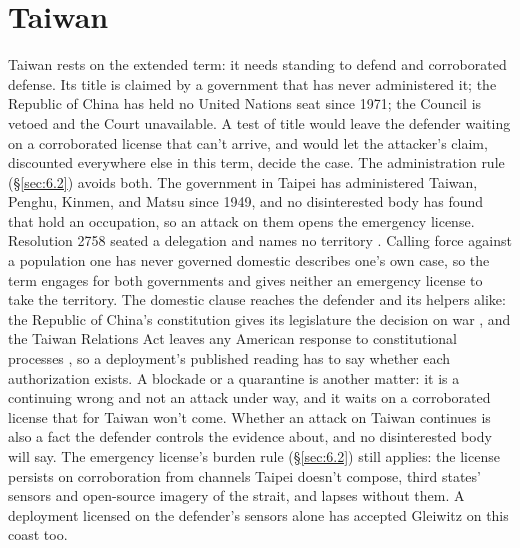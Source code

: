 \section{Taiwan}
\label{sec:B.3}
Taiwan rests on the extended term: it needs standing to defend and corroborated defense. Its title is claimed by a government that has never administered it; the Republic of China has held no United Nations seat since 1971; the Council is vetoed and the Court unavailable. A test of title would leave the defender waiting on a corroborated license that can't arrive, and would let the attacker's claim, discounted everywhere else in this term, decide the case. The administration rule (\S\ref{sec:6.2}) avoids both. The government in Taipei has administered Taiwan, Penghu, Kinmen, and Matsu since 1949, and no disinterested body has found that hold an occupation, so an attack on them opens the emergency license. Resolution 2758 seated a delegation and names no territory \autocite{unga1971res2758}. Calling force against a population one has never governed domestic describes one's own case, so the term engages for both governments and gives neither an emergency license to take the territory. The domestic clause reaches the defender and its helpers alike: the Republic of China's constitution gives its legislature the decision on war \autocite{roc1947constitution}, and the Taiwan Relations Act leaves any American response to constitutional processes \autocite{tra1979}, so a deployment's published reading has to say whether each authorization exists. A blockade or a quarantine is another matter: it is a continuing wrong and not an attack under way, and it waits on a corroborated license that for Taiwan won't come. Whether an attack on Taiwan continues is also a fact the defender controls the evidence about, and no disinterested body will say. The emergency license's burden rule (\S\ref{sec:6.2}) still applies: the license persists on corroboration from channels Taipei doesn't compose, third states' sensors and open-source imagery of the strait, and lapses without them. A deployment licensed on the defender's sensors alone has accepted Gleiwitz on this coast too.
